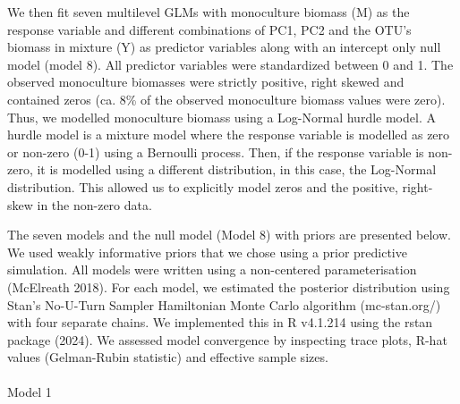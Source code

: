 \documentclass[
  letterpaper,
  DIV=11,
  numbers=noendperiod]{scrartcl}
\makeatletter
\let\oldparagraph\paragraph
\renewcommand{\paragraph}{
    \@ifstar
      \xxxParagraphStar
      \xxxParagraphNoStar
  }
\newcommand{\xxxParagraphStar}[1]{\oldparagraph*{#1}\mbox{}}
\newcommand{\xxxParagraphNoStar}[1]{\oldparagraph{#1}\mbox{}}
\makeatother
\begin{document}
We then fit seven multilevel GLMs with monoculture biomass (M) as the
response variable and different combinations of PC1, PC2 and the OTU's
biomass in mixture (Y) as predictor variables along with an intercept
only null model (model 8). All predictor variables were standardized
between 0 and 1. The observed monoculture biomasses were strictly
positive, right skewed and contained zeros (ca. 8\% of the observed
monoculture biomass values were zero). Thus, we modelled monoculture
biomass using a Log-Normal hurdle model. A hurdle model is a mixture
model where the response variable is modelled as zero or non-zero (0-1)
using a Bernoulli process. Then, if the response variable is non-zero,
it is modelled using a different distribution, in this case, the
Log-Normal distribution. This allowed us to explicitly model zeros and
the positive, right-skew in the non-zero data.

The seven models and the null model (Model 8) with priors are presented
below. We used weakly informative priors that we chose using a prior
predictive simulation. All models were written using a non-centered
parameterisation (McElreath 2018). For each model, we estimated the
posterior distribution using Stan's No-U-Turn Sampler Hamiltonian Monte
Carlo algorithm (mc-stan.org/) with four separate chains. We implemented
this in R v4.1.214 using the rstan package (2024). We assessed model
convergence by inspecting trace plots, R-hat values (Gelman-Rubin
statistic) and effective sample sizes.

\paragraph{Model 1}\label{model-1}
\end{document}

